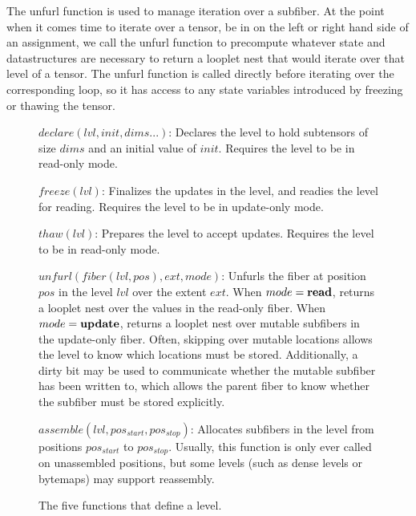 The unfurl function is used to manage iteration over a subfiber. 
%
At the point when it comes time to iterate over a tensor, be in on the left or right hand
side of an assignment, we call the unfurl function to precompute whatever state
and datastructures are necessary to return a looplet nest that would iterate
over that level of a tensor.
%
The unfurl function is called directly before
iterating over the corresponding loop, so it has access to any state variables introduced
by freezing or thawing the tensor.

\begin{figure}[htbp]
    \scriptsize
    \raggedright
$declare(lvl, init, dims...)$: Declares the level to hold subtensors
of size $dims$ and an initial value of $init$. Requires the level to be in
read-only mode.

$freeze(lvl)$: Finalizes the updates in the level, and readies the
level for reading. Requires the level to be in update-only mode.

$thaw(lvl)$: Prepares the level to accept updates. Requires the level
to be in read-only mode.

$unfurl(fiber(lvl, pos), ext, mode)$: Unfurls the fiber at position
$pos$ in the level $lvl$ over the extent $ext$. When $mode = \text{\textbf{read}}$,
returns a looplet nest over the values in the read-only fiber.  When $mode =
\text{\textbf{update}}$, returns a looplet nest over mutable subfibers in the update-only
fiber. Often, skipping over mutable locations allows the level to know which
locations must be stored. Additionally, a dirty bit may be used to communicate
whether the mutable subfiber has been written to, which allows the parent fiber
to know whether the subfiber must be stored explicitly.

$assemble(lvl, pos_{start}, pos_{stop})$: Allocates subfibers in the
level from positions $pos_{start}$ to $pos_{stop}$. Usually, this function is
only ever called on unassembled positions, but some levels (such as dense levels
or bytemaps) may support reassembly.
\vspace{-8pt}
\caption{The five functions that define a level.}
\end{figure}


